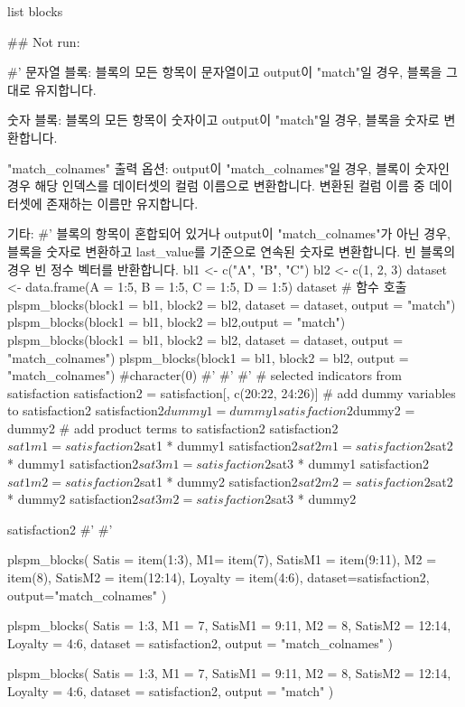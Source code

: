 \documentclass[a4paper]{book}
\begin{document}
%
\begin{Value}
list blocks
\end{Value}
%
\begin{Examples}
\begin{ExampleCode}

\#\# Not run: 

#'
문자열 블록:
  블록의 모든 항목이 문자열이고 output이 "match"일 경우,
   블록을 그대로 유지합니다.

숫자 블록:
  블록의 모든 항목이 숫자이고 output이 "match"일 경우,
  블록을 숫자로 변환합니다.

"match_colnames" 출력 옵션:
  output이 "match_colnames"일 경우, 블록이 숫자인
  경우 해당 인덱스를 데이터셋의 컬럼 이름으로
  변환합니다. 변환된 컬럼 이름 중 데이터셋에
  존재하는 이름만 유지합니다.

기타:
#'   블록의 항목이 혼합되어 있거나 output이
"match_colnames"가 아닌 경우, 블록을 숫자로
변환하고 last_value를 기준으로 연속된 숫자로
변환합니다. 빈 블록의 경우 빈 정수 벡터를
반환합니다.
bl1 <- c("A", "B", "C")
bl2 <- c(1, 2, 3)
dataset <- data.frame(A = 1:5, B = 1:5, C = 1:5, D = 1:5)
dataset
# 함수 호출
plspm_blocks(block1 = bl1, block2 = bl2,
dataset = dataset, output = "match")
plspm_blocks(block1 = bl1, block2 = bl2,output = "match")
plspm_blocks(block1 = bl1, block2 = bl2,
dataset = dataset, output = "match_colnames")
plspm_blocks(block1 = bl1, block2 = bl2,
output = "match_colnames") #character(0)
#'
#'
#'
# selected indicators from satisfaction
satisfaction2 = satisfaction[, c(20:22, 24:26)]
# add dummy variables to satisfaction2
satisfaction2$dummy1 = dummy1
satisfaction2$dummy2 = dummy2
# add product terms to satisfaction2
satisfaction2$sat1m1 = satisfaction2$sat1 * dummy1
satisfaction2$sat2m1 = satisfaction2$sat2 * dummy1
satisfaction2$sat3m1 = satisfaction2$sat3 * dummy1
satisfaction2$sat1m2 = satisfaction2$sat1 * dummy2
satisfaction2$sat2m2 = satisfaction2$sat2 * dummy2
satisfaction2$sat3m2 = satisfaction2$sat3 * dummy2

satisfaction2 %
#'
#'

plspm_blocks(
  Satis = item(1:3),
  M1= item(7),
  SatisM1 = item(9:11),
  M2 = item(8),
  SatisM2 = item(12:14),
  Loyalty = item(4:6),
  dataset=satisfaction2,
  output="match_colnames"
)


plspm_blocks(
  Satis = 1:3,
  M1 = 7,
  SatisM1 = 9:11,
  M2 = 8,
  SatisM2 = 12:14,
  Loyalty = 4:6,
  dataset = satisfaction2,
  output = "match_colnames"
)

plspm_blocks(
  Satis = 1:3,
  M1 = 7,
  SatisM1 = 9:11,
  M2 = 8,
  SatisM2 = 12:14,
  Loyalty = 4:6,
  dataset = satisfaction2,
  output = "match"
)




\end{ExampleCode}
\end{Examples}
\end{document}
